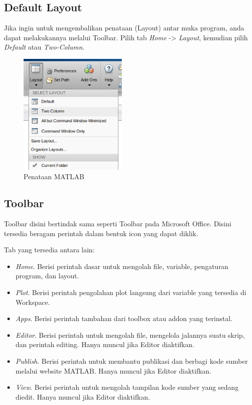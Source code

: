 \documentclass[12pt]{book}
\begin{document}
	\subsection{Default Layout}
	
	Jika ingin untuk mengembalikan penataan (Layout) antar muka program, anda dapat melakukannya melalui Toolbar.
	Pilih tab \textit{Home} -> \textit{Layout}, kemudian pilih \textit{Default} atau \textit{Two-Column}.
	
	\begin{figure}[!ht]
		\centering
		\includegraphics[width=150pt]{images/matlablayout}
		\caption{Penataan MATLAB}
	\end{figure}
	
	\subsection{Toolbar}
	Toolbar disini bertindak sama seperti Toolbar pada Microsoft Office.
	Disini tersedia beragam perintah dalam bentuk icon yang dapat diklik.
	
	\newpage
	Tab yang tersedia antara lain:
	\begin{itemize}
		\item \textit{Home}. Berisi perintah dasar untuk mengolah file, variable, pengaturan program, dan layout.
		\item \textit{Plot}. Berisi perintah pengolahan plot langsung dari variable yang tersedia di Workspace.
		\item \textit{Apps}. Berisi perintah tambahan dari toolbox atau addon yang terinstal.
		\item \textit{Editor}. Berisi perintah untuk mengolah file, mengelola jalannya suatu skrip, dan perintah editing.
		Hanya muncul jika Editor diaktifkan.
		\item \textit{Publish}. Berisi perintah untuk membantu publikasi dan berbagi kode sumber melalui website MATLAB.
		Hanya muncul jika Editor diaktifkan.
		\item \textit{View}. Berisi perintah untuk mengolah tampilan kode sumber yang sedang diedit.
		Hanya muncul jika Editor diaktifkan.	
	\end{itemize}
\end{document}

